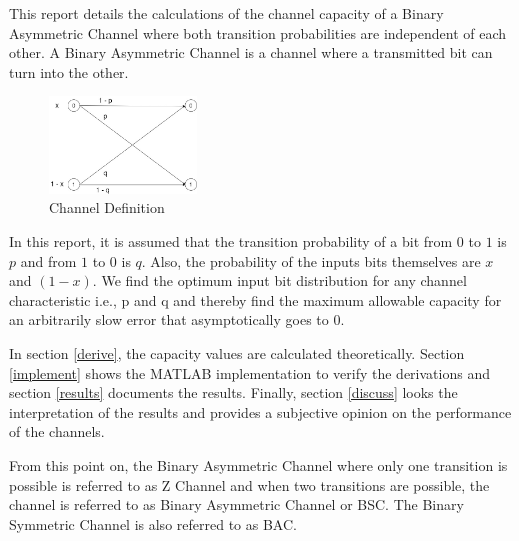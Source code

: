 This report details the calculations of the channel capacity of a Binary Asymmetric Channel where both transition probabilities are independent of each other. A Binary Asymmetric Channel is a channel where a transmitted bit can turn into the other.

\begin{figure}[h!]
    \centering
    \includegraphics[width = 0.35\textwidth]{images/channel.jpg}
    \caption{Channel Definition}
    \label{fig:channel}
\end{figure}

In this report, it is assumed that the transition probability of a bit from $0$ to $1$ is $p$ and from $1$ to $0$ is $q$. Also, the probability of the inputs bits themselves are $x$ and $(1-x)$. We find the optimum input bit distribution for any channel characteristic i.e., p and q and thereby find the maximum allowable capacity for an arbitrarily slow error that asymptotically goes to $0$.

In section \ref{derive}, the capacity values are calculated theoretically. Section \ref{implement} shows the MATLAB implementation to verify the derivations and section \ref{results} documents the results. Finally, section \ref{discuss} looks the interpretation of the results and provides a subjective opinion on the performance of the channels.

From this point on, the Binary Asymmetric Channel where only one transition is possible is referred to as Z Channel and when two transitions are possible, the channel is referred to as Binary Asymmetric Channel or BSC. The Binary Symmetric Channel is also referred to as BAC.